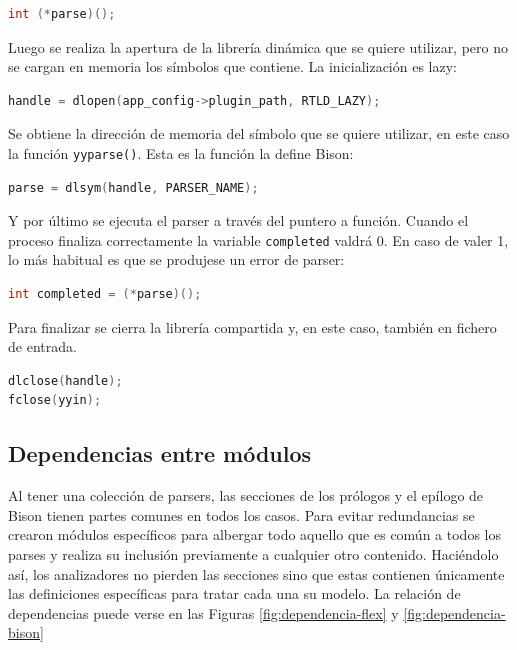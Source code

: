 \begin{lstlisting}[language=C,caption={},label={}]
int (*parse)();
\end{lstlisting}

Luego se realiza la apertura de la librería dinámica que se quiere utilizar, pero no se cargan en memoria los símbolos que contiene. La inicialización es lazy:

\begin{lstlisting}[language=C,caption={},label={}]
handle = dlopen(app_config->plugin_path, RTLD_LAZY);
\end{lstlisting}

Se obtiene la dirección de memoria del símbolo que se quiere utilizar, en este caso la función \verb|yyparse()|. Esta es la función la define Bison:

\begin{lstlisting}[language=C,caption={},label={}]
parse = dlsym(handle, PARSER_NAME);
\end{lstlisting}

Y por último se ejecuta el parser a través del puntero a función. Cuando el proceso finaliza correctamente la variable \verb|completed| valdrá 0. En caso de valer 1, lo más habitual es que se produjese un error de parser:

\begin{lstlisting}[language=C,caption={},label={}]
int completed = (*parse)();
\end{lstlisting}

Para finalizar se cierra la librería compartida y, en este caso, también en fichero de entrada.

\begin{lstlisting}[language=C,caption={},label={}]
dlclose(handle);
fclose(yyin);
\end{lstlisting}

\subsection{Dependencias entre módulos}

Al tener una colección de parsers, las secciones de los prólogos y el epílogo de Bison tienen partes comunes en todos los casos. Para evitar redundancias se crearon módulos específicos para albergar todo aquello que es común a todos los parses y realiza su inclusión previamente a cualquier otro contenido. Haciéndolo así, los analizadores no pierden las secciones sino que estas contienen únicamente las definiciones específicas para tratar cada una su modelo. La relación de dependencias puede verse en las Figuras \ref{fig:dependencia-flex} y \ref{fig:dependencia-bison}

